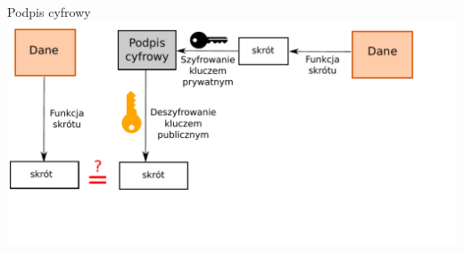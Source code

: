 \begin{frame}{Podpis cyfrowy}
		\includegraphics[height=0.5\paperwidth]{images/dig-sign.pdf}
\end{frame}
